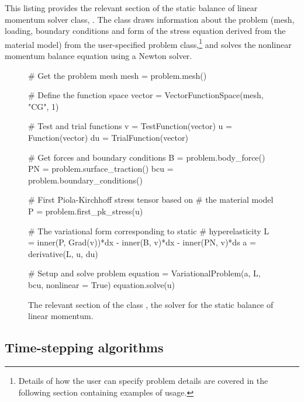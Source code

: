 This listing provides the relevant section of the static balance of
linear momentum solver class, . The
class draws information about the problem (mesh, loading, boundary
conditions and form of the stress equation derived from the material
model) from the user-specified problem class,\footnote{Details of how
the user can specify problem details are covered in the following
section containing examples of \twist{} usage.} and solves the
nonlinear momentum balance equation using a Newton solver.

\begin{figure}
\begin{python}
# Get the problem mesh
mesh = problem.mesh()

# Define the function space
vector = VectorFunctionSpace(mesh, "CG", 1)

# Test and trial functions
v = TestFunction(vector)
u = Function(vector)
du = TrialFunction(vector)

# Get forces and boundary conditions
B = problem.body_force()
PN = problem.surface_traction()
bcu = problem.boundary_conditions()

# First Piola-Kirchhoff stress tensor based on
# the material model
P = problem.first_pk_stress(u)

# The variational form corresponding to static
# hyperelasticity
L = inner(P, Grad(v))*dx - inner(B, v)*dx - inner(PN, v)*ds
a = derivative(L, u, du)

# Setup and solve problem
equation = VariationalProblem(a, L, bcu,
                              nonlinear = True)
equation.solve(u)
\end{python}
\caption{The relevant section of the class , the solver for the static balance of
  linear momentum.}
\label{code:narayanan:staticmomentumsolver}
\end{figure}

\subsection{Time-stepping algorithms}

